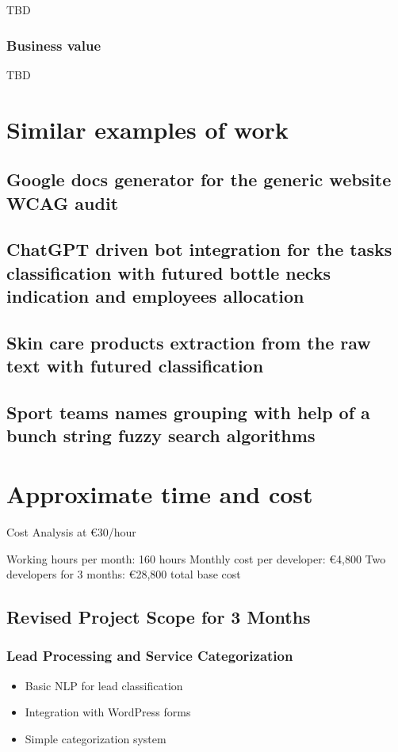 \documentclass[11pt]{article}
\begin{document}
TBD
\subsubsection{Business value}
\label{sec:orgf0c1ef9}

TBD
\section{Similar examples of work}
\label{sec:org183cbe3}
\subsection{Google docs generator for the generic website WCAG audit}
\label{sec:orgae45c74}
\subsection{ChatGPT driven bot integration for the tasks classification with futured bottle necks indication and employees allocation}
\label{sec:org01dd3f9}
\subsection{Skin care products extraction from the raw text with futured classification}
\label{sec:orgd10ee35}
\subsection{Sport teams names grouping with help of a bunch string fuzzy search algorithms}
\label{sec:org2bd334f}
\section{Approximate time and cost}
\label{sec:org07431c9}
Cost Analysis at €30/hour

Working hours per month: 160 hours
Monthly cost per developer: €4,800
Two developers for 3 months: €28,800 total base cost
\subsection{Revised Project Scope for 3 Months}
\label{sec:orge387154}

\subsubsection{Lead Processing and Service Categorization}
\label{sec:org1b6bb15}

\begin{itemize}
\item Basic NLP for lead classification
\item Integration with WordPress forms
\item Simple categorization system
\end{itemize}
\end{document}
